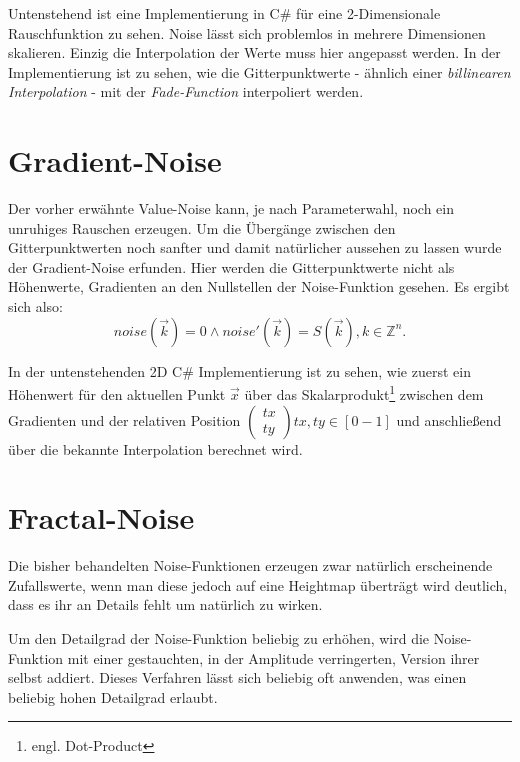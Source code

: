Untenstehend ist eine Implementierung in C\# für eine 2-Dimensionale Rauschfunktion zu sehen.
Noise lässt sich problemlos in mehrere Dimensionen skalieren. Einzig die Interpolation der Werte muss hier angepasst werden. In der Implementierung ist zu sehen, wie die Gitterpunktwerte - ähnlich einer \emph{billinearen Interpolation} - mit der \emph{Fade-Function} interpoliert werden.

\label{valueNoise.cs}

\section{Gradient-Noise}\label{Gradient-Noise}
Der vorher erwähnte Value-Noise kann, je nach Parameterwahl, noch ein unruhiges Rauschen erzeugen. Um die Übergänge zwischen den Gitterpunktwerten noch sanfter und damit natürlicher aussehen zu lassen wurde der Gradient-Noise erfunden.
Hier werden die Gitterpunktwerte nicht als Höhenwerte, Gradienten an den Nullstellen der Noise-Funktion gesehen.
Es ergibt sich also:
\begin{equation}
noise(\vec{k}) = 0 \land 
noise'(\vec{k}) = S(\vec{k}),  k \in \mathbb{Z}^n  .
\end{equation}

In der untenstehenden 2D C\# Implementierung ist zu sehen, wie zuerst ein Höhenwert für den aktuellen Punkt  $\vec{x}$ über das Skalarprodukt\footnote{engl. Dot-Product} zwischen dem Gradienten und der relativen Position $\begin{pmatrix}tx\\ty\end{pmatrix}  tx, ty\in [0-1]$ und anschließend über die bekannte Interpolation berechnet wird.


 

\section{Fractal-Noise}\label{Fractal-Noise}
Die bisher behandelten Noise-Funktionen erzeugen zwar natürlich erscheinende Zufallswerte, wenn man diese jedoch auf eine Heightmap überträgt wird deutlich, dass es ihr an Details fehlt um natürlich zu wirken.

Um den Detailgrad der Noise-Funktion beliebig zu erhöhen, wird die Noise-Funktion mit einer gestauchten, in der Amplitude verringerten, Version ihrer selbst addiert. 
Dieses Verfahren lässt sich beliebig oft anwenden, was einen beliebig hohen Detailgrad erlaubt.

